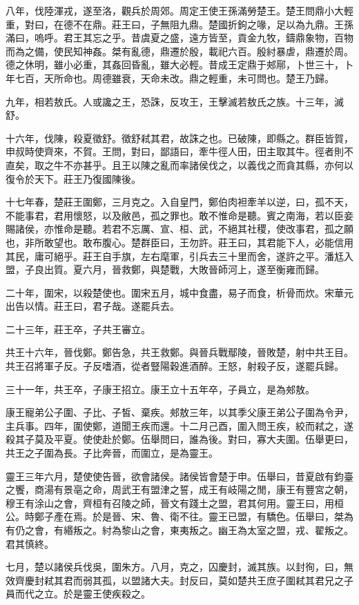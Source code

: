 八年，伐陸渾戎，遂至洛，觀兵於周郊。周定王使王孫滿勞楚王。楚王問鼎小大輕重，對曰，在德不在鼎。莊王曰，子無阻九鼎。楚國折鉤之喙，足以為九鼎。王孫滿曰，嗚呼。君王其忘之乎。昔虞夏之盛，遠方皆至，貢金九牧，鑄鼎象物，百物而為之備，使民知神姦。桀有亂德，鼎遷於殷，載祀六百。殷紂暴虐，鼎遷於周。德之休明，雖小必重，其姦回昏亂，雖大必輕。昔成王定鼎于郟鄏，卜世三十，卜年七百，天所命也。周德雖衰，天命未改。鼎之輕重，未可問也。楚王乃歸。

九年，相若敖氏。人或讒之王，恐誅，反攻王，王擊滅若敖氏之族。十三年，滅舒。

十六年，伐陳，殺夏徵舒。徵舒弒其君，故誅之也。已破陳，即縣之。群臣皆賀，申叔時使齊來，不賀。王問，對曰，鄙語曰，牽牛徑人田，田主取其牛。徑者則不直矣，取之牛不亦甚乎。且王以陳之亂而率諸侯伐之，以義伐之而貪其縣，亦何以復令於天下。莊王乃復國陳後。

十七年春，楚莊王圍鄭，三月克之。入自皇門，鄭伯肉袒牽羊以逆，曰，孤不天，不能事君，君用懷怒，以及敝邑，孤之罪也。敢不惟命是聽。賓之南海，若以臣妾賜諸侯，亦惟命是聽。若君不忘厲、宣、桓、武，不絕其社稷，使改事君，孤之願也，非所敢望也。敢布腹心。楚群臣曰，王勿許。莊王曰，其君能下人，必能信用其民，庸可絕乎。莊王自手旗，左右麾軍，引兵去三十里而舍，遂許之平。潘尪入盟，子良出質。夏六月，晉救鄭，與楚戰，大敗晉師河上，遂至衡雍而歸。

二十年，圍宋，以殺楚使也。圍宋五月，城中食盡，易子而食，析骨而炊。宋華元出告以情。莊王曰，君子哉。遂罷兵去。

二十三年，莊王卒，子共王審立。

共王十六年，晉伐鄭。鄭告急，共王救鄭。與晉兵戰鄢陵，晉敗楚，射中共王目。共王召將軍子反。子反嗜酒，從者豎陽穀進酒醉。王怒，射殺子反，遂罷兵歸。

三十一年，共王卒，子康王招立。康王立十五年卒，子員立，是為郟敖。

康王寵弟公子圍、子比、子皙、棄疾。郟敖三年，以其季父康王弟公子圍為令尹，主兵事。四年，圍使鄭，道聞王疾而還。十二月己酉，圍入問王疾，絞而弒之，遂殺其子莫及平夏。使使赴於鄭。伍舉問曰，誰為後。對曰，寡大夫圍。伍舉更曰，共王之子圍為長。子比奔晉，而圍立，是為靈王。

靈王三年六月，楚使使告晉，欲會諸侯。諸侯皆會楚于申。伍舉曰，昔夏啟有鈞臺之饗，商湯有景亳之命，周武王有盟津之誓，成王有岐陽之閒，康王有豐宮之朝，穆王有涂山之會，齊桓有召陵之師，晉文有踐土之盟，君其何用。靈王曰，用桓公。時鄭子產在焉。於是晉、宋、魯、衛不往。靈王已盟，有驕色。伍舉曰，桀為有仍之會，有緡叛之。紂為黎山之會，東夷叛之。幽王為太室之盟，戎、翟叛之。君其慎終。

七月，楚以諸侯兵伐吳，圍朱方。八月，克之，囚慶封，滅其族。以封徇，曰，無效齊慶封弒其君而弱其孤，以盟諸大夫。封反曰，莫如楚共王庶子圍弒其君兄之子員而代之立。於是靈王使疾殺之。


